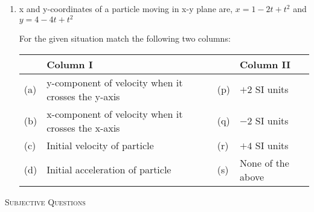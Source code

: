 \documentclass{article}
\begin{document}
\begin{enumerate}
    \item x and y-coordinates of a particle moving in x-y plane are, \( x = 1 - 2t + t^2 \) and \( y = 4 - 4t + t^2 \)

  For the given situation match the following two columns:
  
  \begin{center}
      \renewcommand{\arraystretch}{2}
      \begin{table}[h]
          \centering
          \begin{tabular}{p{0.25cm}p{8cm}|p{0.25cm}p{5cm}}
          \hline
          & Column I & &Column II \\
          \hline
          (a)& y-component of velocity when it crosses the y-axis & (p) & \( + 2 \) SI units \\
          (b)& x-component of velocity when it crosses the x-axis & (q) & \( - 2 \) SI units \\
          (c)& Initial velocity of particle & (r) & \( + 4 \) SI units \\
          (d)& Initial acceleration of particle & (s) & None of the above \\
          \hline
          \end{tabular}
      \end{table}
  \end{center}
\end{enumerate}
  

\begin{center}
    \textsc{Subjective Questions}
\end{center}
\end{document}
